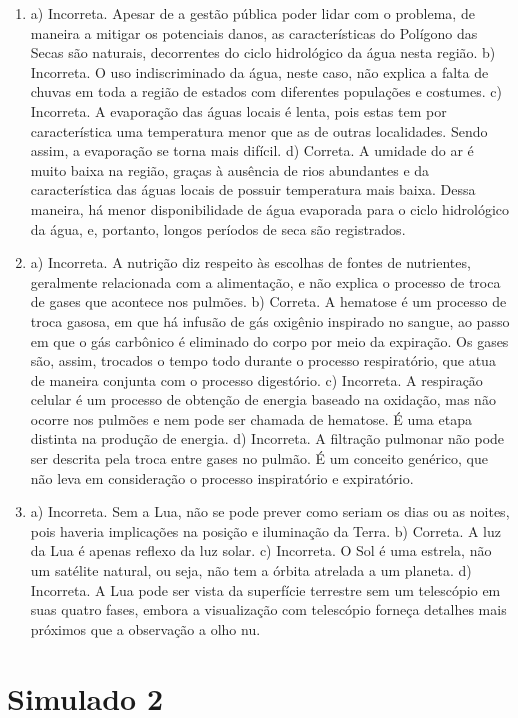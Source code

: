 \begin{enumerate}
\item
a) Incorreta. Apesar de a gestão pública poder lidar com o problema, de
maneira a mitigar os potenciais danos, as características do Polígono das
Secas são naturais, decorrentes do ciclo hidrológico da água nesta
região.
b) Incorreta. O uso indiscriminado da água, neste caso, não explica a
falta de chuvas em toda a região de estados com diferentes populações e
costumes. 
c) Incorreta. A evaporação das águas locais é lenta, pois estas tem por
característica uma temperatura menor que as de outras localidades. Sendo
assim, a evaporação se torna mais difícil.
d) Correta. A umidade do ar é muito baixa na região, graças à ausência
de rios abundantes e da característica das águas locais de possuir
temperatura mais baixa. Dessa maneira, há menor disponibilidade de água
evaporada para o ciclo hidrológico da água, e, portanto, longos períodos
de seca são registrados.

\item
a) Incorreta. A nutrição diz respeito às escolhas de fontes de
nutrientes, geralmente relacionada com a alimentação, e não explica o
processo de troca de gases que acontece nos pulmões.
b) Correta. A hematose é um processo de troca gasosa, em que há infusão
de gás oxigênio inspirado no sangue, ao passo em que o gás carbônico é
eliminado do corpo por meio da expiração. Os gases são, assim, trocados
o tempo todo durante o processo respiratório, que atua de maneira
conjunta com o processo digestório.
c) Incorreta. A respiração celular é um processo de obtenção de energia
baseado na oxidação, mas não ocorre nos pulmões e nem pode ser chamada
de hematose. É uma etapa distinta na produção de energia.
d) Incorreta. A filtração pulmonar não pode ser descrita pela troca
entre gases no pulmão. É um conceito genérico, que não leva em
consideração o processo inspiratório e expiratório.

\item
a) Incorreta. Sem a Lua, não se pode prever como seriam os dias ou as
noites, pois haveria implicações na posição e iluminação da
Terra.
b) Correta. A luz da Lua é apenas reflexo da luz solar.
c) Incorreta. O Sol é uma estrela, não um satélite natural, ou seja, não
tem a órbita atrelada a um planeta.
d) Incorreta. A Lua pode ser vista da superfície terrestre sem um
telescópio em suas quatro fases, embora a visualização com telescópio
forneça detalhes mais próximos que a observação a olho nu.
\end{enumerate}

\section*{Simulado 2}

